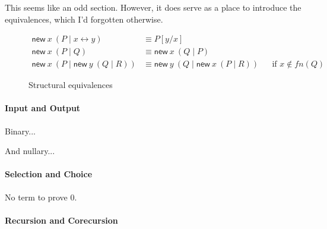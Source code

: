 \documentclass[orivec,envcountsame]{llncs}
\newcommand{\cpdual}[1]{#1^\perp}
\newcommand{\mkwd}[1]{\mathsf{#1}}
\newcommand{\link}[2]{#1 \leftrightarrow #2}
\newcommand{\cut}[4]{\mkwd{new}\:#1 \: (#3 \mid #4)}
\begin{document}
This seems like an odd section.  However, it does serve as a place to introduce the equivalences,
which I'd forgotten otherwise.

\begin{figure}\small
\begin{align*}
  \cut{x}{A}{P}{\link{x}{y}} &\equiv P[y/x] \\
  \cut{x}{A}{P}{Q} &\equiv \cut{x}{\cpdual{A}}{Q}{P} \\
  \cut{x}{A}{P}{\cut{y}{B}{Q}{R}} &\equiv \cut{y}{B}{Q}{\cut{x}{A}{P}{R}} &&\text{if $x \not\in fn(Q)$}
\end{align*}
\caption{Structural equivalences}\label{fig:equivalences}
\end{figure}

\paragraph{Input and Output}

Binary...

And nullary...

{\small}

\paragraph{Selection and Choice}

No term to prove 0.

\paragraph{Recursion and Corecursion}
\end{document}

